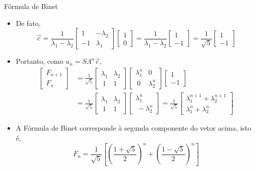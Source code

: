\begin{frame}[fragile]{Fórmula de Binet}

    \begin{itemize}
        \item De fato,
        \[
            \vec{c} = \frac{1}{\lambda_1 - \lambda_2}\begin{bmatrix} 1 & -\lambda_2 \\ -1 & \lambda_1 \end{bmatrix}
\begin{bmatrix} 1 \\ 0 \end{bmatrix} = 
            \frac{1}{\lambda_1 - \lambda_2}\begin{bmatrix} 1 \\ -1 \end{bmatrix} =
            \frac{1}{\sqrt{5}}\begin{bmatrix} 1 \\ -1 \end{bmatrix}
        \]

        \item Portanto, como $u_n = S\Lambda^n \vec{c}$, 
        \begin{align*}
            \begin{bmatrix} F_{n + 1} \\ F_n \end{bmatrix} &= 
            \frac{1}{\sqrt{5}}\begin{bmatrix} \lambda_1 & \lambda_2 \\\ 1 & 1 \end{bmatrix}
            \begin{bmatrix} \lambda_1^n & 0 \\\ 0 & \lambda_2^n \end{bmatrix}
            \begin{bmatrix} 1 \\ -1 \end{bmatrix} \\
            &= \frac{1}{\sqrt{5}}
            \begin{bmatrix} \lambda_1 & \lambda_2 \\\ 1 & 1 \end{bmatrix}
            \begin{bmatrix} \lambda_1^n \\\ -\lambda_2^n \end{bmatrix} 
            = \frac{1}{\sqrt{5}}
            \begin{bmatrix} \lambda_1^{n + 1} + \lambda_2^{n + 1} \\ \lambda_1^{n} + \lambda_2^{n}   \end{bmatrix}
        \end{align*}

        \item A Fórmula de Binet corresponde à segunda componente do vetor acima, isto é,
        \[
            F_n = \frac{1}{\sqrt{5}}\left[\left(\frac{1 + \sqrt{5}}{2}\right)^{n} + \left(\frac{1 - \sqrt{5}}{2}\right)^{n}\right]
        \]
    \end{itemize}

\end{frame}
